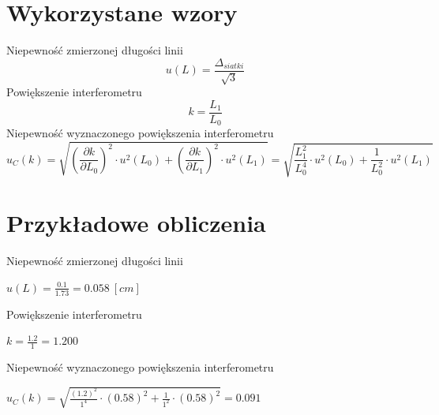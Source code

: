 \documentclass[12pt, a4paper, oneside]{article}
\begin{document}
\section{Wykorzystane wzory}
Niepewność zmierzonej długości linii
\begin{equation}
u(L)=\frac{\Delta_{siatki}}{\sqrt{3}}
\end{equation}
Powiększenie interferometru
\begin{equation}
k=\frac{L_1}{L_0}
\end{equation}
Niepewność wyznaczonego powiększenia interferometru
\begin{equation}
u_C(k)=\sqrt{(\frac{\partial k}{\partial L_0})^2\cdot u^2(L_0)+(\frac{\partial k}{\partial L_1})^2\cdot u^2(L_1)}=\sqrt{\frac{L_1^2}{L_0^4}\cdot u^2(L_0)+\frac{1}{L_0^2}\cdot u^2(L_1)}
\end{equation}
\section{Przykładowe obliczenia}
Niepewność zmierzonej długości linii
\begin{center}
$u(L)=\frac{0.1}{1.73}=0.058~[cm]$
\end{center}
Powiększenie interferometru
\begin{center}
$k=\frac{1.2}{1}=1.200$
\end{center}
Niepewność wyznaczonego powiększenia interferometru
\begin{center}
$u_C(k)=\sqrt{\frac{(1.2)^2}{1^4}\cdot(0.58)^2+\frac{1}{1^2}\cdot(0.58)^2}=0.091$
\end{center}
\clearpage
\end{document}
